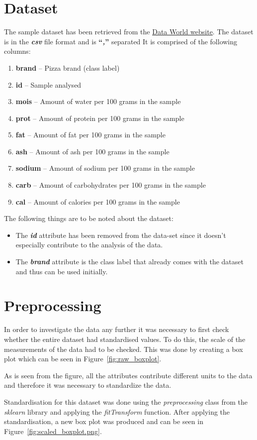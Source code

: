 \documentclass[preprint,12pt]{elsarticle}
\begin{document}
\section{Dataset}
\label{s:Dataset}
The sample dataset has been retrieved from the \href{https://data.world/sdhilip/pizza-datasets}{Data World website}. 
The dataset is in the \textbf{\textit{csv}} file format and is \textbf{``\textit{,}'' }separated It is comprised of the following columns:
\begin{enumerate}
\item \textbf{brand} -- Pizza brand (class label)
\item \textbf{id} -- Sample analysed
\item \textbf{mois} -- Amount of water per 100 grams in the sample
\item \textbf{prot} -- Amount of protein per 100 grams in the sample
\item \textbf{fat} -- Amount of fat per 100 grams in the sample
\item \textbf{ash} -- Amount of ash per 100 grams in the sample
\item \textbf{sodium} -- Amount of sodium per 100 grams in the sample
\item \textbf{carb} -- Amount of carbohydrates per 100 grams in the sample
\item \textbf{cal} -- Amount of calories per 100 grams in the sample
\end{enumerate}
\par
The following things are to be noted about the dataset:
\begin{itemize}
\item The \textbf{\textit{id}} attribute has been removed from the data-set since it doesn't  especially contribute to the analysis of the data.
\item The \textbf{\textit{brand}} attribute is the class label that already comes with the dataset and thus can be used initially.
\end{itemize}
\section{Preprocessing}
\label{ss:Preprocessing}
In order to investigate the data any further it was necessary to first check whether the entire dataset had standardised values. To do this, the
scale of the measurements of the data had to be checked. This was done by creating a box plot which can be seen in Figure~\ref{fig:raw_boxplot}.
\par
As is seen from the figure, all the attributes contribute different units to the data and therefore it was necessary to standardize the data.
\par
Standardisation for this dataset was done using the \textit{preprocessing} class from the \textit{sklearn} library \cite{scaling2020}  and applying the \textit{fitTransform} 
function. After applying the standardisation, a new box plot was produced and can be seen in Figure~\ref{fig:scaled_boxplot.png}. 
\end{document}
